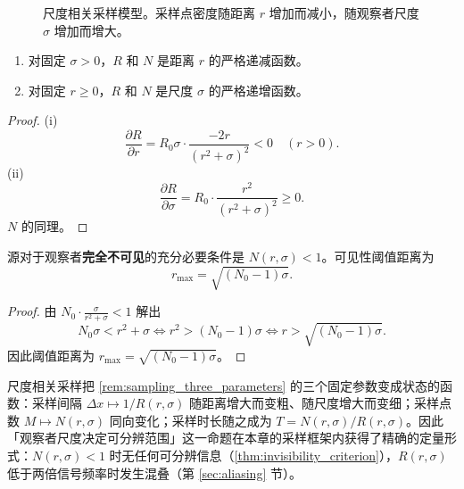 \begin{figure}[htbp]
    \centering
    \caption{尺度相关采样模型。采样点密度随距离 $r$ 增加而减小，随观察者尺度 $\sigma$ 增加而增大。}
    \label{fig:dynamic_sampling}
\end{figure}

\begin{property}[采样函数的单调性]\label{prop:sampling_monotonicity}
\begin{enumerate}[label=(\roman*)]
    \item 对固定 $\sigma > 0$，$R$ 和 $N$ 是距离 $r$ 的严格递减函数。
    \item 对固定 $r \ge 0$，$R$ 和 $N$ 是尺度 $\sigma$ 的严格递增函数。
\end{enumerate}
\end{property}

\begin{proof}
(i) 
\[
\frac{\partial R}{\partial r} = R_0 \sigma \cdot \frac{-2r}{(r^2 + \sigma)^2} < 0 \quad (r > 0).
\]
(ii)
\[
\frac{\partial R}{\partial \sigma} = R_0 \cdot \frac{r^2}{(r^2 + \sigma)^2} \ge 0.
\]
$N$ 的同理。
\end{proof}

\begin{theorem}[不可见性判据]\label{thm:invisibility_criterion}
源对于观察者\textbf{完全不可见}的充分必要条件是 $N(r, \sigma) < 1$。可见性阈值距离为
\[
r_{\text{max}} = \sqrt{(N_0 - 1)\sigma}.
\]
\end{theorem}

\begin{proof}
由 $N_0 \cdot \frac{\sigma}{r^2 + \sigma} < 1$ 解出
\[
N_0\sigma < r^2+\sigma
\iff
r^2 > (N_0-1)\sigma
\iff
r > \sqrt{(N_0-1)\sigma}.
\]
因此阈值距离为 $r_{\text{max}} = \sqrt{(N_0 - 1)\sigma}$。
\end{proof}

\begin{remark}[与采样三要素的关系]\label{rem:dynamic_sampling_vs_three}
尺度相关采样把 \cref{rem:sampling_three_parameters} 的三个固定参数变成状态的函数：采样间隔 $\Delta x\mapsto1/R(r,\sigma)$ 随距离增大而变粗、随尺度增大而变细；采样点数 $M\mapsto N(r,\sigma)$ 同向变化；采样时长随之成为 $T=N(r,\sigma)/R(r,\sigma)$。因此「观察者尺度决定可分辨范围」这一命题在本章的采样框架内获得了精确的定量形式：$N(r,\sigma)<1$ 时无任何可分辨信息（\cref{thm:invisibility_criterion}），$R(r,\sigma)$ 低于两倍信号频率时发生混叠（第 \ref{sec:aliasing} 节）。
\end{remark}

